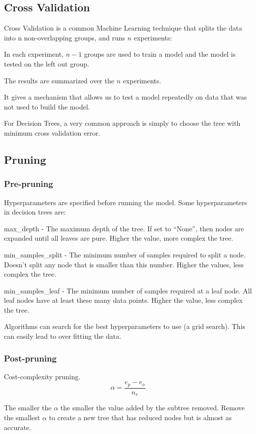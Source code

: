 	\subsection{Cross Validation}
Cross Validation is a common Machine Learning technique that splits the data into n non-overlapping groups, and runs $n$ experiments:
	\begin{bulletedlist}
		\item In each experiment, $n-1$ groups are used to train a model and the model is tested on the left out group.
		\item The results are summarized over the $n$ experiments.
		\item It gives a mechanism that allows us to test a model repeatedly on data that was not used to build the model.
		\item For Decision Trees, a very common approach is simply to choose the tree with minimum cross validation error.
	\end{bulletedlist}

	\subsection{Pruning}
	\subsubsection{Pre-pruning}
Hyperparameters are specified before running the model.  Some hyperparameters in decision trees are:
	\begin{bulletedlist}
		\item max\_depth - The maximum depth of the tree. If set to ``None'', then nodes are expanded until all leaves are pure. Higher the value, more complex the tree.
		\item min\_samples\_split - The minimum number of samples required to split a node. Doesn't split any node that is smaller than this number. Higher the values, less complex the tree.
		\item min\_samples\_leaf - The minimum number of samples required at a leaf node. All leaf nodes have at least these many data points. Higher the value, less complex the tree.
	\end{bulletedlist}

Algorithms can search for the best hyperparameters to use (a grid search).  This can easily lead to over fitting the data.

	\subsubsection{Post-pruning}
Cost-complexity pruning.
	\begin{equation}
		\alpha = \frac{e_p - e_o}{n_r}
	\end{equation}
	\begin{mathwhere}[0.4in]
	\end{mathwhere}
The smaller the $\alpha$ the smaller the value added by the subtree removed.  Remove the smallest $\alpha$ to create a new tree that has reduced nodes but is almost as accurate.

